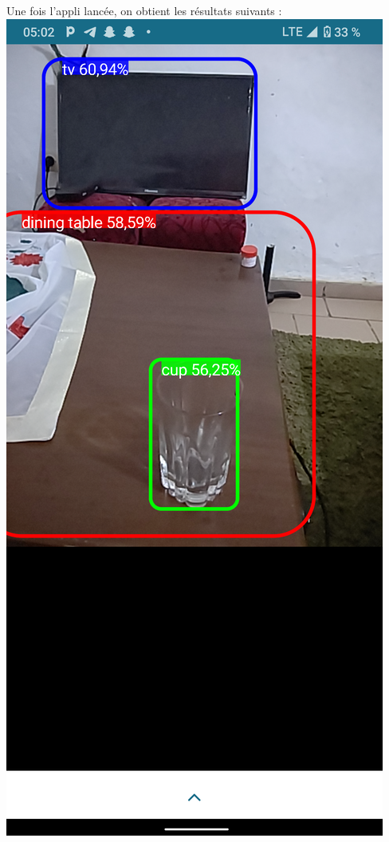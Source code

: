\documentclass[a4paper, 13px]{article}
\begin{document}
Une fois l’appli lancée, on obtient les résultats suivants : \\
\includegraphics[scale=0.15]{img9.png}\\
\end{document}
